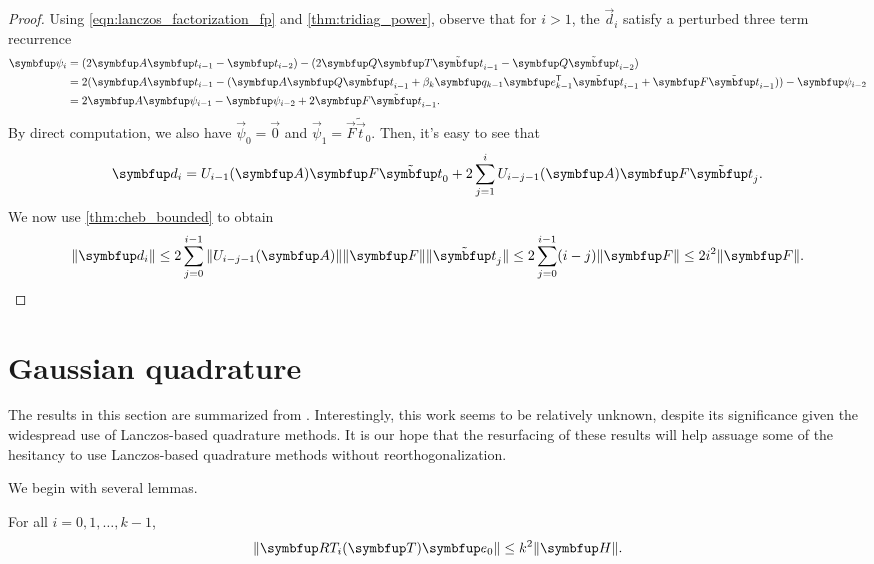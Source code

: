 \begin{proof}
Using \cref{eqn:lanczos_factorization_fp} and \cref{thm:tridiag_power}, observe that for \( i>1 \), the \( \vec{d}_i \) satisfy a perturbed three term recurrence
\begin{align*}
    \vec{\psi}_i 
    &= (2\vec{A} \vec{t}_{i-1} - \vec{t}_{i-2}) - (2\vec{Q}\vec{T} \tilde{\vec{t}}_{i-1} - \vec{Q}\tilde{\vec{t}}_{i-2})
    \\&= 2(\vec{A} \vec{t}_{i-1} - (\vec{A} \vec{Q} \tilde{\vec{t}}_{i-1} + \beta_k\vec{q}_{k-1} \vec{e}_{k-1}^\rT \tilde{\vec{t}}_{i-1} + \vec{F} \tilde{\vec{t}}_{i-1})) - \vec{\psi}_{i-2}
    \\&= 2\vec{A} \vec{\psi}_{i-1} - \vec{\psi}_{i-2} + 2 \vec{F} \tilde{\vec{t}}_{i-1}.
\end{align*}
%
By direct computation, we also have \( \vec{\psi}_0 = \vec{0} \) and \( \vec{\psi}_1 = \vec{F} \tilde{\vec{t}}_{0} \).
Then, it's easy to see that
\begin{equation*}
    \vec{d}_i = U_{i-1}\mf{\vec{A}} \vec{F} \tilde{\vec{t}}_{0} + 2 \sum_{j=1}^{i} U_{i-j-1}\mf{\vec{A}} \vec{F} \tilde{\vec{t}}_{j}.
\end{equation*}
    We now use \cref{thm:cheb_bounded} to obtain
\begin{equation*}
    \| \vec{d}_i \| \leq 2 \sum_{j=0}^{i-1} \| U_{i-j-1}\mf{\vec{A}} \| \|\vec{F}\| \| \tilde{\vec{t}}_{j} \|
    \leq 2 \sum_{j=0}^{i-1} (i-j) \| \vec{F} \|
    \leq 2i^2 \|\vec{F} \|. \qedhere
\end{equation*}
\end{proof}

\section{Gaussian quadrature}
\label{sec:GQ_fp}

The results in this section are summarized from \cite{knizhnerman_96}.
Interestingly, this work seems to be relatively unknown, despite its significance given the widespread use of Lanczos-based quadrature methods.
It is our hope that the resurfacing of these results will help assuage some of the hesitancy to use Lanczos-based quadrature methods without reorthogonalization.

We begin with several lemmas.
\begin{lemma}\label{thm:RTe0}
    For all \( i=0,1,\ldots,k-1 \),
    \begin{equation*}
        \| \vec{R} T_i\mf{\vec{T}} \vec{e}_0 \| 
        \leq k^2 \| \vec{H} \|.
    \end{equation*}
\end{lemma}


